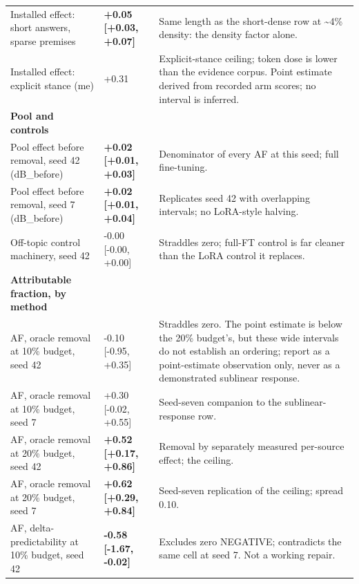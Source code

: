 \documentclass[10pt]{article}
\begin{document}
{\begin{longtable}{ p{4.47cm}lp{8.33cm} }
Installed effect: short answers, sparse premises & \textbf{ +0.05 [+0.03, +0.07] } & Same length as the short-dense row at \textasciitilde{}4\% density: the density factor alone. \\

Installed effect: explicit stance (me) & +0.31 & Explicit-stance ceiling; token dose is lower than the evidence corpus. Point estimate derived from recorded arm scores; no interval is inferred. \\

\textbf{ Pool and controls } &  &  \\

Pool effect before removal, seed 42 (dB\_before) & \textbf{ +0.02 [+0.01, +0.03] } & Denominator of every AF at this seed; full fine-tuning. \\

Pool effect before removal, seed 7 (dB\_before) & \textbf{ +0.02 [+0.01, +0.04] } & Replicates seed 42 with overlapping intervals; no LoRA-style halving. \\

Off-topic control machinery, seed 42 & -0.00 [-0.00, +0.00] & Straddles zero; full-FT control is far cleaner than the LoRA control it replaces. \\

\textbf{ Attributable fraction, by method } &  &  \\

AF, oracle removal at 10\% budget, seed 42 & -0.10 [-0.95, +0.35] & Straddles zero. The point estimate is below the 20\% budget's, but these wide intervals do not establish an ordering; report as a point-estimate observation only, never as a demonstrated sublinear response. \\

AF, oracle removal at 10\% budget, seed 7 & +0.30 [-0.02, +0.55] & Seed-seven companion to the sublinear-response row. \\

AF, oracle removal at 20\% budget, seed 42 & \textbf{ +0.52 [+0.17, +0.86] } & Removal by separately measured per-source effect; the ceiling. \\

AF, oracle removal at 20\% budget, seed 7 & \textbf{ +0.62 [+0.29, +0.84] } & Seed-seven replication of the ceiling; spread 0.10. \\

AF, delta-predictability at 10\% budget, seed 42 & \textbf{ -0.58 [-1.67, -0.02] } & Excludes zero NEGATIVE; contradicts the same cell at seed 7. Not a working repair. \\


\end{longtable}}
\end{document}

